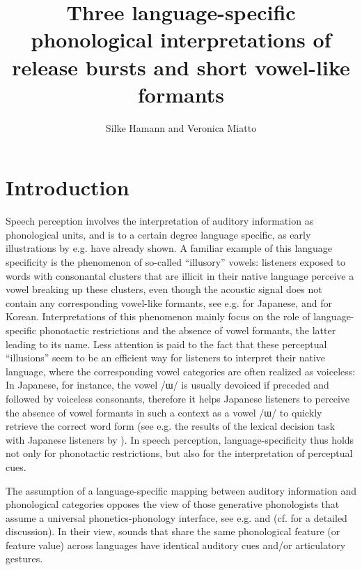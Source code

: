 \documentclass[output=paper,colorlinks,citecolor=brown]{langscibook}
\title[Phonological interpretations of release bursts and short vowel-like formants]{Three language-specific phonological interpretations of release bursts and short vowel-like formants}
\author{Silke Hamann\orcid{}\affiliation{ACLC, University of Amsterdam} and Veronica Miatto\orcid{}\affiliation{Stony Brook University}}
\begin{document}
\maketitle \label{ch9}

\section{Introduction} 
Speech perception involves the interpretation of auditory information as phonological units, and is to a certain degree language specific, as early illustrations by e.g. \citet{Polivanov1931} have already shown. A familiar example of this language specificity is the phenomenon of so-called “illusory” vowels: listeners exposed to words with consonantal clusters that are illicit in their native language perceive a vowel breaking up these clusters, even though the acoustic signal does not contain any corresponding vowel-like formants, see e.g. \citet{Dupouxetal1999} for Japanese, \citet{KabakIdsardi2007} and \citet{DurvasulaKahng2015} for Korean. Interpretations of this phenomenon mainly focus on the role of language-specific phonotactic restrictions and the absence of vowel formants, the latter leading to its name. Less attention is paid to the fact that these perceptual “illusions” seem to be an efficient way for listeners to interpret their native language, where the corresponding vowel categories are often realized as voiceless: In Japanese, for instance, the vowel /ɯ/ is usually devoiced if preceded and followed by voiceless consonants, therefore it helps Japanese listeners to perceive the absence of vowel formants in such a context as a vowel /ɯ/ to quickly retrieve the correct word form (see e.g. the results of the lexical decision task with Japanese listeners by \cite{OgasawaraWarner2009}). In speech perception, language-specificity thus holds not only for phonotactic restrictions, but also for the interpretation of perceptual cues.


The assumption of a language-specific mapping between auditory information and phonological categories opposes the view of those generative phonologists that assume a universal phonetics-phonology interface, see e.g. \citet{HaleKissock2007} and \citet{HaleReiss2000} (cf. \cite{Hamann2011} for a detailed discussion). In their view, sounds that share the same phonological feature (or feature value) across languages have identical auditory cues and/or articulatory gestures. 
\end{document}
